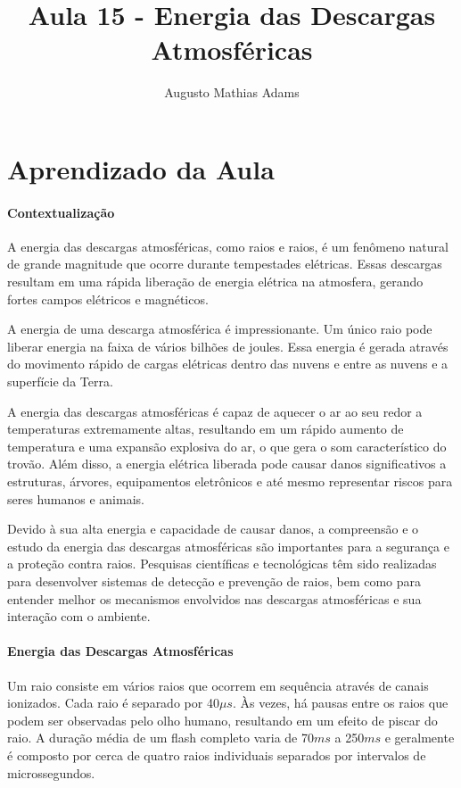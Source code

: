 \documentclass[a4paper, 12pt, onecolumn,singlespacing]{article}
\title{Aula 15 - Energia das Descargas Atmosféricas}
\author[1]{Augusto Mathias Adams}
\affil[1]{augusto.adams@ufpr.br}
\begin{document}
	
	\maketitle
	
	\section{Aprendizado da Aula}
	
	\paragraph{Contextualização}
	
	A energia das descargas atmosféricas, como raios e raios, é um fenômeno natural de grande magnitude que ocorre durante tempestades elétricas. Essas descargas resultam em uma rápida liberação de energia elétrica na atmosfera, gerando fortes campos elétricos e magnéticos.
	
	A energia de uma descarga atmosférica é impressionante. Um único raio pode liberar energia na faixa de vários bilhões de joules. Essa energia é gerada através do movimento rápido de cargas elétricas dentro das nuvens e entre as nuvens e a superfície da Terra.
	
	A energia das descargas atmosféricas é capaz de aquecer o ar ao seu redor a temperaturas extremamente altas, resultando em um rápido aumento de temperatura e uma expansão explosiva do ar, o que gera o som característico do trovão. Além disso, a energia elétrica liberada pode causar danos significativos a estruturas, árvores, equipamentos eletrônicos e até mesmo representar riscos para seres humanos e animais.
	
	Devido à sua alta energia e capacidade de causar danos, a compreensão e o estudo da energia das descargas atmosféricas são importantes para a segurança e a proteção contra raios. Pesquisas científicas e tecnológicas têm sido realizadas para desenvolver sistemas de detecção e prevenção de raios, bem como para entender melhor os mecanismos envolvidos nas descargas atmosféricas e sua interação com o ambiente.
	
	\paragraph{Energia das Descargas Atmosféricas}
	
	Um raio consiste em vários raios que ocorrem em sequência através de canais ionizados. Cada raio é separado por 40$\mu s$. Às vezes, há pausas entre os raios que podem ser observadas pelo olho humano, resultando em um efeito de piscar do raio. A duração média de um flash completo varia de 70$ms$ a 250$ms$ e geralmente é composto por cerca de quatro raios individuais separados por intervalos de microssegundos.
	
\end{document}
